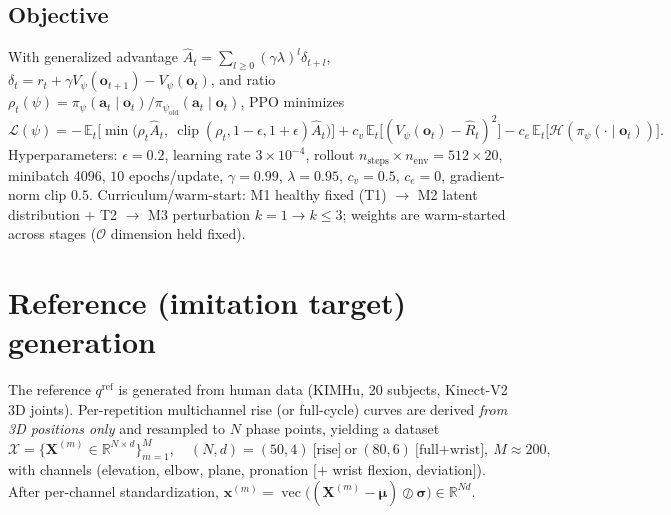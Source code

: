 \documentclass[11pt]{article}
\newcommand{\R}{\mathbb{R}}
\newcommand{\Obs}{\mathcal{O}}
\newcommand{\qref}{q^{\mathrm{ref}}}
\renewcommand{\vec}[1]{\mathbf{#1}}
\newcommand{\clip}{\operatorname{clip}}
\begin{document}
\subsection{Objective}
With generalized advantage $\hat A_t=\sum_{l\ge0}(\gamma\lambda)^l\delta_{t+l}$, $\delta_t=r_t+\gamma V_\psi(\vec o_{t+1})-V_\psi(\vec o_t)$, and ratio $\rho_t(\psi)=\pi_\psi(\vec a_t\mid\vec o_t)/\pi_{\psi_{\mathrm{old}}}(\vec a_t\mid\vec o_t)$, PPO minimizes
\begin{equation}
\mathcal L(\psi)=-\,\mathbb E_t\!\Big[\min\!\big(\rho_t\hat A_t,\ \clip(\rho_t,1{-}\epsilon,1{+}\epsilon)\hat A_t\big)\Big]
+c_v\,\mathbb E_t\!\big[(V_\psi(\vec o_t)-\hat R_t)^2\big]-c_e\,\mathbb E_t\!\big[\mathcal H(\pi_\psi(\cdot\mid\vec o_t))\big].
\end{equation}
Hyperparameters: $\epsilon{=}0.2$, learning rate $3\!\times\!10^{-4}$, rollout $n_{\text{steps}}\!\times\!n_{\text{env}}=512\!\times\!20$, minibatch $4096$, $10$ epochs/update, $\gamma{=}0.99$, $\lambda{=}0.95$, $c_v{=}0.5$, $c_e{=}0$, gradient-norm clip $0.5$. Curriculum/warm-start: M1 healthy fixed (T1) $\to$ M2 latent distribution $+$ T2 $\to$ M3 perturbation $k{=}1\!\to\!k\!\le\!3$; weights are warm-started across stages ($\Obs$ dimension held fixed).

\section{Reference (imitation target) generation}\label{sec:ref}
The reference $\qref$ is generated from human data (KIMHu, 20 subjects, Kinect-V2 3D joints). Per-repetition multichannel rise (or full-cycle) curves are derived \emph{from 3D positions only} and resampled to $N$ phase points, yielding a dataset
\begin{equation}
\mathcal X=\{\vec X^{(m)}\in\R^{N\times d}\}_{m=1}^{M},\quad (N,d)=(50,4)\ \text{[rise]}\ \text{or}\ (80,6)\ \text{[full+wrist]},\ M\approx200,
\end{equation}
with channels (elevation, elbow, plane, pronation $[+$ wrist flexion, deviation$]$). After per-channel standardization, $\vec x^{(m)}=\operatorname{vec}\big((\vec X^{(m)}-\boldsymbol\mu)\oslash\boldsymbol\sigma\big)\in\R^{Nd}$.
\end{document}
